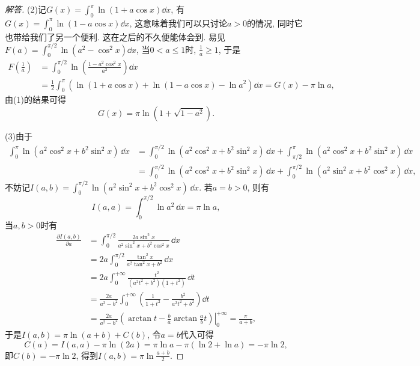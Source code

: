 \begin{a}
\begin{enumerate}
\begin{proof}[解答]
(2)记\(G(x)=\int_{0}^{\pi}\ln\left(1+a\cos x\right)\dd x\), 
有\(G(x)=\int_{0}^{\pi}\ln\left(1-a\cos x\right)\dd x\), 
这意味着我们可以只讨论\(a>0\)的情况, 同时它也带给我们了另一个便利. 这在之后的不久便能体会到. 
易见\(F(a)=\int_{0}^{\pi/2}\ln\left(a^2-\cos^2x\right)\dd x\), 
当\(0<a\leqslant 1\)时, \(\frac{1}{a}\geqslant 1\), 于是
\[\begin{split}
F\left(\frac{1}{a}\right)&=\int_{0}^{\pi/2}\ln\left(\frac{1-a^2\cos^2x}{a^2}\right)\dd x\\
&=\frac{1}{2}\int_{0}^{\pi}\left(\ln(1+a\cos x)+\ln(1-a\cos x)-\ln a^2\right)\dd x=G(x)-\pi \ln a,
\end{split}\]
由(1)的结果可得\[G(x)=\pi\ln\left(1+\sqrt{1-a^2}\right).\]

(3)由于\[\begin{split}
\int_{0}^{\pi}\ln(a^2\cos^2x+b^2\sin^2x)\,\dd x
&=\int_{0}^{\pi/2}\ln(a^2\cos^2x+b^2\sin^2x)\,\dd x
+\int_{\pi/2}^{\pi}\ln(a^2\cos^2x+b^2\sin^2x)\,\dd x\\
&=\int_{0}^{\pi/2}\ln(a^2\cos^2x+b^2\sin^2x)\,\dd x
+\int_{0}^{\pi/2}\ln(a^2\sin^2x+b^2\cos^2x)\,\dd x,
\end{split}\]
不妨记\(I(a,b)=\int_{0}^{\pi/2}\ln(a^2\sin^2x+b^2\cos^2x)\,\dd x\). 
若\(a=b>0\), 则有\[I(a,a)=\int_{0}^{\pi/2}\ln a^2\,\dd x=\pi\ln a,\]
当\(a,b>0\)时有\[\begin{split}
\frac{\partial I(a,b)}{\partial a}
&=\int_{0}^{\pi/2}\frac{2a\sin^2x}{a^2\sin^2x+b^2\cos^2x}\,\dd x\\
&=2a\int_{0}^{\pi/2}\frac{\tan^2x}{a^2\tan^2x+b^2}\,\dd x\\
&=2a\int_{0}^{+\infty}\frac{t^2}{(a^2t^2+b^2)(1+t^2)}\,\dd t\\
&=\frac{2a}{a^2-b^2}\int_{0}^{+\infty}\left(\frac{1}{1+t^2}
-\frac{b^2}{a^2t^2+b^2}\right)\dd t\\
&=\frac{2a}{a^2-b^2}\left.\left(\arctan t-\frac{b}{a}\arctan\frac{a}{b}t\right)\right|^{+\infty}_0=\frac{\pi}{a+b},
\end{split}\]于是\(I(a,b)=\pi\ln(a+b)+C(b)\), 令\(a=b\)代入可得
\[C(a)=I(a,a)-\pi\ln\left(2a\right)
=\pi\ln a-\pi\left(\ln 2+\ln a\right)=-\pi\ln 2,\]
即\(C(b)=-\pi\ln 2\), 得到\(I(a,b)=\pi\ln\frac{a+b}{2}\).


\end{proof}
\end{enumerate}
\end{a}
